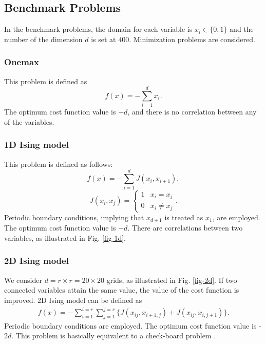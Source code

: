 \subsection{Benchmark Problems}
In the benchmark problems, 
the domain for each variable is $x_i \in \{0,1\}$ and
the number of the dimension $d$ is set at $400$.
Minimization problems are considered.


\subsubsection{Onemax}
This problem is defined as
\begin{equation}
 f(x)=-\sum_{i=1}^{d} x_i.
\end{equation}
The optimum cost function value is $-d$, and
there is no correlation between any of the variables.


\subsubsection{1D Ising model}
This problem is defined as follows:
 \begin{equation}
  f(x)=-\sum_{i=1}^{d} J(x_i,x_{i+1}),
 \end{equation}
\begin{equation}
 J(x_i,x_j)= \left\{
  \begin{array}{rl}
    1 & x_i=x_j \\
    0 & x_i \neq x_j
  \end{array} \right.
.
\label{ising-connection}
\end{equation}
Periodic boundary conditions, implying that
$x_{d+1}$ is treated as $x_1$,
are employed.
The optimum cost function value is $-d$.
There are correlations between two variables,
as illustrated in Fig. \ref{fig-1d}.


\subsubsection{2D Ising model}
We consider $d=r \times r=20 \times 20$ grids, as illustrated in
Fig. \ref{fig-2d}.
If two connected variables attain the same value,
the value of the cost function is improved.
2D Ising model can be defined as
\begin{eqnarray}
 f(x)=-\sum_{i=1}^{i=r} \sum_{j=1}^{j=r} 
 \{J(x_{ij},x_{i+1,j}) +J(x_{ij},x_{i,j+1})\}.
\end{eqnarray}
Periodic boundary conditions are employed.
The optimum cost function value is -$2d$.
This problem is basically equivalent to a check-board problem
\cite{larranaga:eda}.

